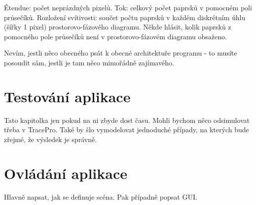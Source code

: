 Étendue: počet neprázdných pixelů. Tok: celkový počet paprsků v pomocném
poli průsečíků. Rozložení svítivosti: součet počtu paprsků v každém
diskrétním úhlu (šířky 1 pixel) prostorovo-fázového diagramu. Někde
hlásit, kolik paprsků z pomocného pole průsečíků není v
prostorovo-fázovém diagramu obsaženo.

Nevím, jestli něco obecného psát k obecné architektuře programu - to
musíte posoudit sám, jestli je tam něco mimořádně zajímavého.



\section{Testování aplikace}

Tato kapitolka jen pokud na ni zbyde dost času. Mohli bychom něco
odsimulovat třeba v TracePro. Také by šlo vymodelovat jednoduché
případy, na kterých bude zřejmé, že výsledek je správně.



\section{Ovládání aplikace}

Hlavně napsat, jak se definuje scéna. Pak případně popsat GUI.

